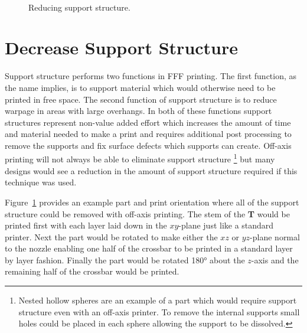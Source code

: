 \documentclass[main.tex]{subfiles}
\begin{document}
\begin{figure}[]
\linethickness{1.2pt}
\center
	\quad
	\\
	\caption{Reducing support structure.}
	\label{reducedsupport}
\end{figure}

\section{Decrease Support Structure}
Support structure performs two functions in FFF printing.
The first function, as the name implies, is to support material which would otherwise need to be printed in free space.
The second function of support structure is to reduce warpage in areas with large overhangs.
In both of these functions support structures represent non-value added effort which increases the amount of time and material needed to make a print and requires additional post processing to remove the supports and fix surface defects which supports can create.
Off-axis printing will not always be able to eliminate support structure%
\footnote{Nested hollow spheres are an example of a part which would require support structure even with an off-axis printer. To remove the internal supports small holes could be placed in each sphere allowing the support to be dissolved.}
but many designs would see a reduction in the amount of support structure required if this technique was used.



Figure~\ref{reducedsupport} provides an example part and print orientation where all of the support structure could be removed with off-axis printing.
The stem of the \textbf{T} would be printed first with each layer laid down in the $xy$\nobreakdash-plane just like a standard printer.
Next the part would be rotated to make either the $xz$ or $yz$\nobreakdash-plane normal to the nozzle enabling one half of the crossbar to be printed in a standard layer by layer fashion.
Finally the part would be rotated \ang{180} about the $z$\nobreakdash-axis and the remaining half of the crossbar would be printed.
\end{document}
